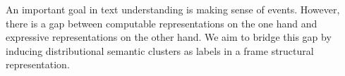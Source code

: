 An important goal in text understanding is making sense of events. However, there is a gap between computable representations on the one hand and expressive representations on the other hand. We aim to bridge this gap by inducing distributional semantic clusters as labels in a frame structural representation.
